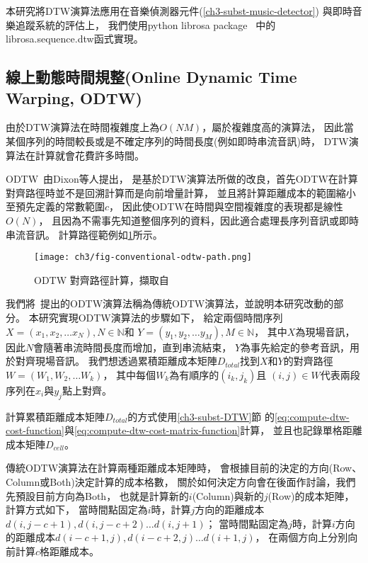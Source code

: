\documentclass[class=NCU_thesis, crop=false]{standalone}
\begin{document}
本研究將DTW演算法應用在音樂偵測器元件(\cref{ch3-subst-music-detector})
與即時音樂追蹤系統的評估上，
我們使用python librosa package~\cite{McFee2024librosa}
中的librosa.sequence.dtw函式實現。

\subsection{線上動態時間規整(Online Dynamic Time Warping, ODTW)} \label{ch3-subst-ODTW}
由於DTW演算法在時間複雜度上為$O(NM)$，屬於複雜度高的演算法，
因此當某個序列的時間較長或是不確定序列的時間長度(例如即時串流音訊)時，
DTW演算法在計算就會花費許多時間。

ODTW~\cite{dixon2005ODTW}由Dixon等人提出，
是基於DTW演算法所做的改良，首先ODTW在計算對齊路徑時並不是回溯計算而是向前增量計算，
並且將計算距離成本的範圍縮小至預先定義的常數範圍$c$，
因此使ODTW在時間與空間複雜度的表現都是線性$O(N)$，
且因為不需事先知道整個序列的資料，因此適合處理長序列音訊或即時串流音訊。
計算路徑範例如\cref{fig:fig-ch3-conventional-odtw-path}所示。

\begin{figure}[H]
    \centering
    \texttt{[image: ch3/fig-conventional-odtw-path.png]}
    \caption{ODTW 對齊路徑計算，擷取自~\cite{dixon2005ODTW}}
    \label{fig:fig-ch3-conventional-odtw-path}
\end{figure}

我們將~\cite{dixon2005ODTW}提出的ODTW演算法稱為傳統ODTW演算法，並說明本研究改動的部分。
本研究實現ODTW演算法的步驟如下，
給定兩個時間序列
$X = (x_1, x_2, \dots x_N), N \in \mathbb{N}$和
$Y = (y_1, y_2, \dots y_M), M \in \mathbb{N}$，
其中$X$為現場音訊，因此$N$會隨著串流時間長度而增加，直到串流結束，
$Y$為事先給定的參考音訊，用於對齊現場音訊。
我們想透過累積距離成本矩陣$D_{total}$找到$X$和$Y$的對齊路徑$W = (W_1, W_2, \dots W_k)$，
其中每個$W_k$為有順序的$(i_k,j_k)$且
$(i,j) \in W$代表兩段序列在$x_i$與$y_j$點上對齊。

計算累積距離成本矩陣$D_{total}$的方式使用\ref{ch3-subst-DTW}節
的\cref{eq:compute-dtw-cost-function}與\cref{eq:compute-dtw-cost-matrix-function}計算，
並且也記錄單格距離成本矩陣$D_{cell}$。

傳統ODTW演算法在計算兩種距離成本矩陣時，
會根據目前的決定的方向(Row、Column或Both)決定計算的成本格數，
關於如何決定方向會在後面作討論，我們先預設目前方向為Both，
也就是計算新的$i$(Column)與新的$j$(Row)的成本矩陣，
計算方式如下，
當時間點固定為$i$時，計算$j$方向的距離成本$d(i, j-c+1), d(i, j-c+2) \dots d(i, j+1)$；
當時間點固定為$j$時，計算$i$方向的距離成本$d(i-c+1, j), d(i-c+2, j) \dots d(i+1, j)$，
在兩個方向上分別向前計算$c$格距離成本。
\end{document}
